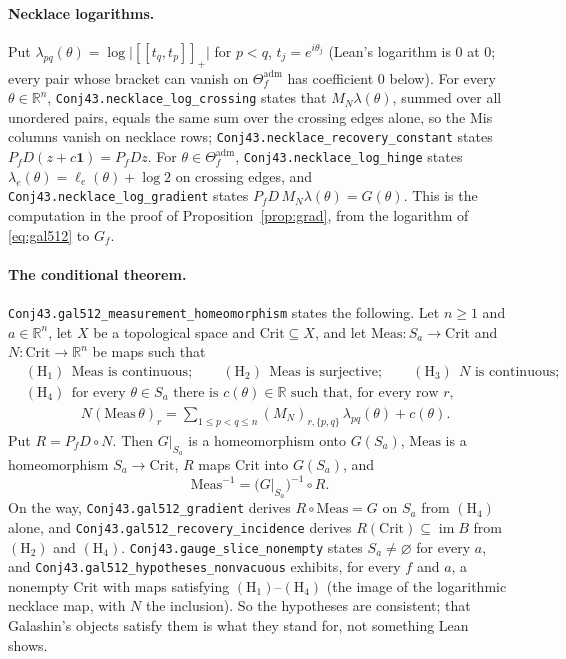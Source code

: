 \documentclass[11pt]{article}
\theoremstyle{definition}
\DeclareMathOperator{\im}{im}
\newcommand{\R}{\mathbb{R}}
\newcommand{\Theadm}{\Theta_f^{\mathrm{adm}}}
\begin{document}
\paragraph{Necklace logarithms.}
Put $\lambda_{pq}(\theta)=\log\lvert[\![t_q,t_p]\!]_+\rvert$ for $p<q$, $t_j=e^{i\theta_j}$ (Lean's
logarithm is $0$ at $0$; every pair whose bracket can vanish on $\Theadm$ has coefficient $0$ below).
For every $\theta\in\R^n$, \texttt{Conj43.\allowbreak necklace\_\allowbreak log\_\allowbreak crossing} states that $M_N\lambda(\theta)$, summed
over all unordered pairs, equals the same sum over the crossing edges alone, so the Mis columns vanish on
necklace rows; \texttt{Conj43.\allowbreak necklace\_\allowbreak recovery\_\allowbreak constant} states $P_fD(z+c\mathbf1)=P_fDz$. For
$\theta\in\Theadm$, \texttt{Conj43.\allowbreak necklace\_\allowbreak log\_\allowbreak hinge} states $\lambda_e(\theta)=\ell_e(\theta)+\log2$
on crossing edges, and \texttt{Conj43.\allowbreak necklace\_\allowbreak log\_\allowbreak gradient} states $P_fD\,M_N\lambda(\theta)=G(\theta)$.
This is the computation in the proof of Proposition~\ref{prop:grad}, from the logarithm of
\eqref{eq:gal512} to $G_f$.

\paragraph{The conditional theorem.}
\texttt{Conj43.\allowbreak gal512\_\allowbreak measurement\_\allowbreak homeomorphism} states the following. Let $n\ge1$ and $a\in\R^n$, let
$X$ be a topological space and $\mathrm{Crit}\subseteq X$, and let $\mathrm{Meas}\colon S_a\to\mathrm{Crit}$
and $N\colon\mathrm{Crit}\to\R^n$ be maps such that
\begin{align*}
 &(\mathrm H_1)\ \ \mathrm{Meas}\text{ is continuous};\qquad
  (\mathrm H_2)\ \ \mathrm{Meas}\text{ is surjective};\qquad
  (\mathrm H_3)\ \ N\text{ is continuous};\\
 &(\mathrm H_4)\ \ \text{for every }\theta\in S_a\text{ there is }c(\theta)\in\R\text{ such that, for every
 row }r,\\
 &\qquad\qquad N(\mathrm{Meas}\,\theta)_r=\sum_{1\le p<q\le n}(M_N)_{r,\{p,q\}}\,\lambda_{pq}(\theta)+c(\theta).
\end{align*}
Put $R=P_fD\circ N$. Then $G|_{S_a}$ is a homeomorphism onto $G(S_a)$, $\mathrm{Meas}$ is a homeomorphism
$S_a\to\mathrm{Crit}$, $R$ maps $\mathrm{Crit}$ into $G(S_a)$, and
\[
 \mathrm{Meas}^{-1}=\bigl(G|_{S_a}\bigr)^{-1}\circ R .
\]
On the way, \texttt{Conj43.\allowbreak gal512\_\allowbreak gradient} derives $R\circ\mathrm{Meas}=G$ on $S_a$ from
$(\mathrm H_4)$ alone, and \texttt{Conj43.\allowbreak gal512\_\allowbreak recovery\_\allowbreak incidence} derives $R(\mathrm{Crit})\subseteq
\im B$ from $(\mathrm H_2)$ and $(\mathrm H_4)$. \texttt{Conj43.\allowbreak gauge\_\allowbreak slice\_\allowbreak nonempty} states
$S_a\ne\varnothing$ for every $a$, and \texttt{Conj43.\allowbreak gal512\_\allowbreak hypotheses\_\allowbreak nonvacuous} exhibits, for every
$f$ and $a$, a nonempty $\mathrm{Crit}$ with maps satisfying $(\mathrm H_1)$--$(\mathrm H_4)$ (the image
of the logarithmic necklace map, with $N$ the inclusion). So the hypotheses are consistent; that
Galashin's objects satisfy them is what they stand for, not something Lean shows.
\end{document}

